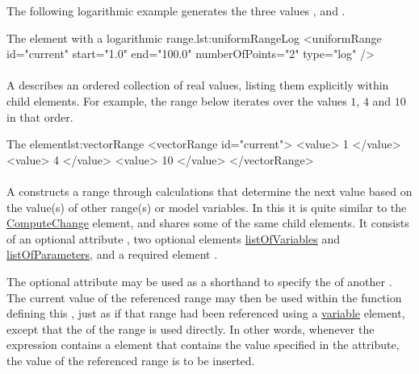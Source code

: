 The following logarithmic example generates the three values ,  and .
\begin{myXmlLst}{The  element with a logarithmic range.}{lst:uniformRangeLog}
    <uniformRange id="current" start="1.0" end="100.0" numberOfPoints="2" type="log" />
\end{myXmlLst}

\paragraph{}
\label{class:vectorRange}


A  describes an ordered collection of real values, listing them explicitly within child  elements.
For example, the range below iterates over the values $1$, $4$ and $10$ in that order.
\begin{myXmlLst}{The  element}{lst:vectorRange}
    <vectorRange id="current"> 
        <value> 1 </value> 
        <value> 4 </value> 
        <value> 10 </value> 
    </vectorRange> 
\end{myXmlLst}

\paragraph{}
\label{class:functionalRange}


A  constructs a range through calculations that determine the next value based on the value(s) of other range(s) or model variables.
In this it is quite similar to the \hyperref[class:computeChange]{ComputeChange} element, and shares some of the same child elements.
It consists of an optional attribute , two optional elements \hyperref[sec:listOfVariables]{listOfVariables} and \hyperref[sec:listOfParameters]{listOfParameters}, and a required element .

The optional attribute  may be used as a shorthand to specify the  of another .
The current value of the referenced range may then be used within the function defining this , just as if that range had been referenced using a \hyperref[class:variable]{variable} element, except that the  of the range is used directly.
In other words, whenever the expression contains a  element that contains the value specified in the  attribute, the value of the referenced range is to be inserted.

